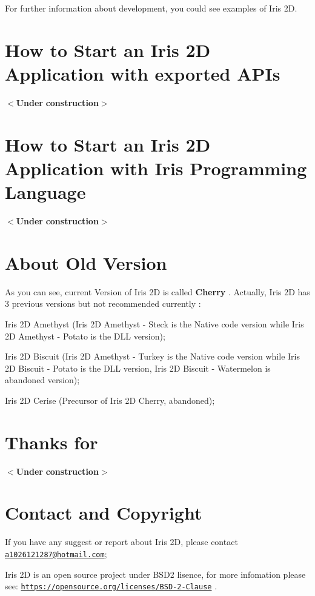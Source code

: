For further information about development, you could see examples of Iris 2D.\hypertarget{index_install_sec_2}{}\section{How to Start an Iris 2\+D Application with exported A\+P\+Is}\label{index_install_sec_2}
\begin{DoxyParagraph}{}
$<${\bfseries Under} {\bfseries construction$>$} 
\end{DoxyParagraph}
\hypertarget{index_install_sec_3}{}\section{How to Start an Iris 2\+D Application with Iris Programming Language}\label{index_install_sec_3}
\begin{DoxyParagraph}{}
$<${\bfseries Under} {\bfseries construction$>$} 
\end{DoxyParagraph}
\hypertarget{index_name_stg}{}\section{About Old Version}\label{index_name_stg}
As you can see, current Version of Iris 2D is called {\bfseries  Cherry }. Actually, Iris 2D has 3 previous versions but not recommended currently \+:

\begin{DoxyItemize}
\item Iris 2D Amethyst (Iris 2D Amethyst -\/ Steck is the Native code version while Iris 2D Amethyst -\/ Potato is the D\+LL version); \item Iris 2D Biscuit (Iris 2D Amethyst -\/ Turkey is the Native code version while Iris 2D Biscuit -\/ Potato is the D\+LL version, Iris 2D Biscuit -\/ Watermelon is abandoned version); \item Iris 2D Cerise (Precursor of Iris 2D Cherry, abandoned);\end{DoxyItemize}
\hypertarget{index_thanks}{}\section{Thanks for}\label{index_thanks}
\begin{DoxyParagraph}{}
$<${\bfseries Under} {\bfseries construction$>$} 
\end{DoxyParagraph}
\hypertarget{index_cont_cprt}{}\section{Contact and Copyright}\label{index_cont_cprt}
\begin{DoxyParagraph}{}
If you have any suggest or report about Iris 2D, please contact \href{mailto:a1026121287@hotmail.com}{\tt a1026121287@hotmail.\+com}; 
\end{DoxyParagraph}
\begin{DoxyParagraph}{}
Iris 2D is an open source project under B\+S\+D2 lisence, for more infomation please see\+: \href{https://opensource.org/licenses/BSD-2-Clause}{\tt https\+://opensource.\+org/licenses/\+B\+S\+D-\/2-\/\+Clause} . 
\end{DoxyParagraph}
